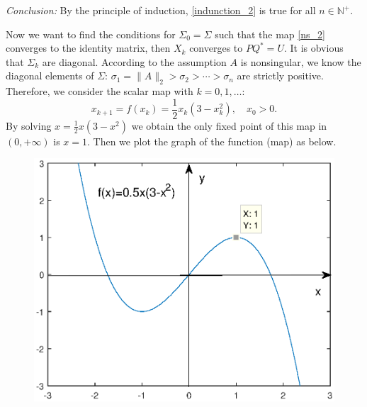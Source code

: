 \documentclass[12pt]{article}
\def\norm#1{\|#1\|}
\begin{document}
{\it Conclusion:} By the principle of induction, \eqref{indunction_2} is true for all $n\in \mathbb{N^+}$.

Now we want to find the conditions for $\Sigma_0=\Sigma$ such that the map \eqref{ns_2} converges to the identity matrix, then $X_{k}$ converges to $PQ^*=U$. It is obvious that $\Sigma_k$ are diagonal. According to the assumption $A$ is nonsingular, we know the diagonal elements of $\Sigma$: $\sigma_1=\norm{A}_2>\sigma_2>\dotsm>\sigma_n$ are strictly positive. Therefore, we consider the scalar map with $k=0,1,\dotsc$:
\begin{equation}\label{scalar_map}
x_{k+1}=f(x_k)=\frac{1}{2}x_k(3-x_k^2), \quad x_0>0.
\end{equation}
By solving $x=\frac{1}{2}x(3-x^2)$ we obtain the only fixed point of this map in $(0,+\infty)$ is $x= 1$. Then we plot the graph of the function (map) as below.
\begin{figure}[h]
	\centering
	\includegraphics[width=.6\textwidth]{function.eps}
\end{figure}
\end{document}
